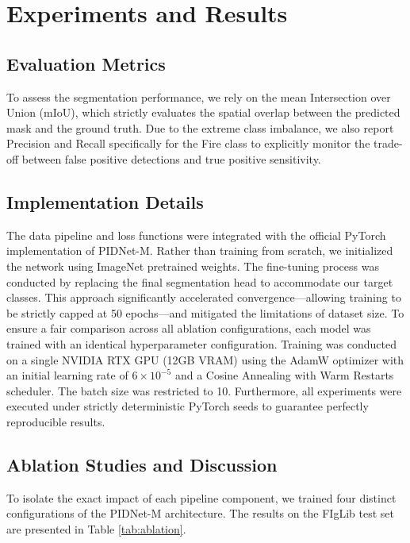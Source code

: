 \documentclass[conference]{IEEEtran}
\begin{document}
\section{Experiments and Results}

\subsection{Evaluation Metrics}
To assess the segmentation performance, we rely on the mean Intersection over Union (mIoU), which strictly evaluates the spatial overlap between the predicted mask and the ground truth. Due to the extreme class imbalance, we also report Precision and Recall specifically for the Fire class to explicitly monitor the trade-off between false positive detections and true positive sensitivity.

\subsection{Implementation Details}
The data pipeline and loss functions were integrated with the official PyTorch implementation of PIDNet-M. Rather than training from scratch, we initialized the network using ImageNet pretrained weights. The fine-tuning process was conducted by replacing the final segmentation head to accommodate our target classes. This approach significantly accelerated convergence---allowing training to be strictly capped at 50 epochs---and mitigated the limitations of dataset size. To ensure a fair comparison across all ablation configurations, each model was trained with an identical hyperparameter configuration. Training was conducted on a single NVIDIA RTX GPU (12GB VRAM) using the AdamW optimizer with an initial learning rate of $6 \times 10^{-5}$ and a Cosine Annealing with Warm Restarts scheduler. The batch size was restricted to 10. Furthermore, all experiments were executed under strictly deterministic PyTorch seeds to guarantee perfectly reproducible results.

\subsection{Ablation Studies and Discussion}
To isolate the exact impact of each pipeline component, we trained four distinct configurations of the PIDNet-M architecture. The results on the FIgLib test set are presented in Table \ref{tab:ablation}.
\end{document}
